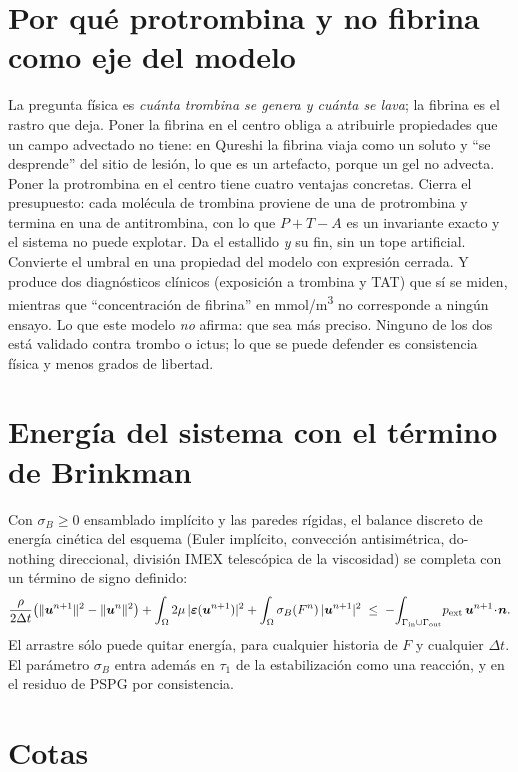 \documentclass[11pt,a4paper]{article}
\newcommand{\bu}{\bm{u}}
\newcommand{\bn}{\bm{n}}
\begin{document}
\section{Por qué protrombina y no fibrina como eje del modelo}

La pregunta física es \emph{cuánta trombina se genera y cuánta se lava}; la fibrina es el rastro que deja. Poner la fibrina en el centro obliga a atribuirle propiedades que un campo advectado no tiene: en Qureshi la fibrina viaja como un soluto y ``se desprende'' del sitio de lesión, lo que es un artefacto, porque un gel no advecta. Poner la protrombina en el centro tiene cuatro ventajas concretas. Cierra el presupuesto: cada molécula de trombina proviene de una de protrombina y termina en una de antitrombina, con lo que $P+T-A$ es un invariante exacto y el sistema no puede explotar. Da el estallido \emph{y} su fin, sin un tope artificial. Convierte el umbral en una propiedad del modelo con expresión cerrada. Y produce dos diagnósticos clínicos (exposición a trombina y TAT) que sí se miden, mientras que ``concentración de fibrina'' en \si{mmol/m^3} no corresponde a ningún ensayo. Lo que este modelo \emph{no} afirma: que sea más preciso. Ninguno de los dos está validado contra trombo o ictus; lo que se puede defender es consistencia física y menos grados de libertad.

\section{Energía del sistema con el término de Brinkman}

Con $\sigma_B\ge0$ ensamblado implícito y las paredes rígidas, el balance discreto de energía cinética del esquema (Euler implícito, convección antisimétrica, do-nothing direccional, división IMEX telescópica de la viscosidad) se completa con un término de signo definido:
\begin{equation}
\frac{\rho}{2\Delta t}\big(\|\bu^{n+1}\|^2-\|\bu^n\|^2\big)+\int_\Omega 2\mu\,|\bm\varepsilon(\bu^{n+1})|^2
+\int_\Omega\sigma_B(F^n)\,|\bu^{n+1}|^2\;\le\;-\!\int_{\Gamma_{\rm in}\cup\Gamma_{\rm out}}\!p_{\rm ext}\,\bu^{n+1}\!\cdot\!\bn .
\end{equation}
El arrastre sólo puede quitar energía, para cualquier historia de $F$ y cualquier $\Delta t$. El parámetro $\sigma_B$ entra además en $\tau_1$ de la estabilización como una reacción, y en el residuo de PSPG por consistencia.

\section{Cotas}
\end{document}
